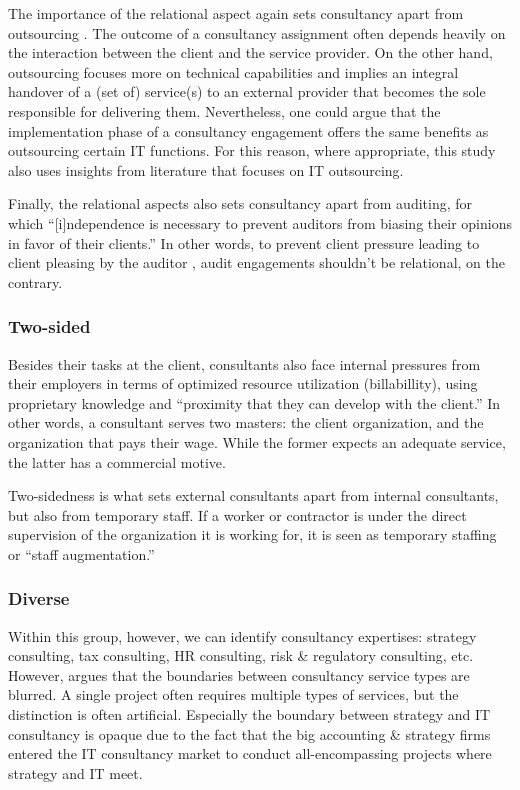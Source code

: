\documentclass[12pt]{article}
\begin{document}
The importance of the relational aspect again sets consultancy apart
from outsourcing \citep[ 171-173]{kipping2012}. The outcome of a
consultancy assignment often depends heavily on the interaction between
the client and the service provider. On the other hand, outsourcing
focuses more on technical capabilities and implies an integral handover
of a (set of) service(s) to an external provider that becomes the sole
responsible for delivering them. Nevertheless, one could argue that the
implementation phase of a consultancy engagement offers the same
benefits as outsourcing certain IT functions. For this reason, where
appropriate, this study also uses insights from literature that focuses
on IT outsourcing.

Finally, the relational aspects also sets consultancy apart from
auditing, for which ``{[}i{]}ndependence is necessary to prevent
auditors from biasing their opinions in favor of their clients.''
\citep[ 310]{bazerman2011} In other words, to prevent client pressure
leading to client pleasing by the auditor \citep{koch2017}, audit
engagements shouldn't be relational, on the contrary.

\subsubsection{Two-sided}\label{two-sided}

Besides their tasks at the client, consultants also face internal
pressures from their employers in terms of optimized resource
utilization (billabillity), using proprietary knowledge and ``proximity
that they can develop with the client.'' \citet[138]{chowdhury2021} In
other words, a consultant serves two masters: the client organization,
and the organization that pays their wage. While the former expects an
adequate service, the latter has a commercial motive. \citep[
270]{furusten2012}

Two-sidedness is what sets external consultants apart from internal
consultants, but also from temporary staff. If a worker or contractor is
under the direct supervision of the organization it is working for, it
is seen as temporary staffing or ``staff augmentation.'' \citep[
1]{hodosi2019}

\subsubsection{Diverse}\label{diverse}

Within this group, however, we can identify consultancy expertises:
strategy consulting, tax consulting, HR consulting, risk \& regulatory
consulting, etc. However, \citet[71-72]{armbruster2006} argues that the
boundaries between consultancy service types are blurred. A single
project often requires multiple types of services, but the distinction
is often artificial. Especially the boundary between strategy and IT
consultancy is opaque due to the fact that the big accounting \&
strategy firms entered the IT consultancy market to conduct
all-encompassing projects where strategy and IT meet.
\end{document}
